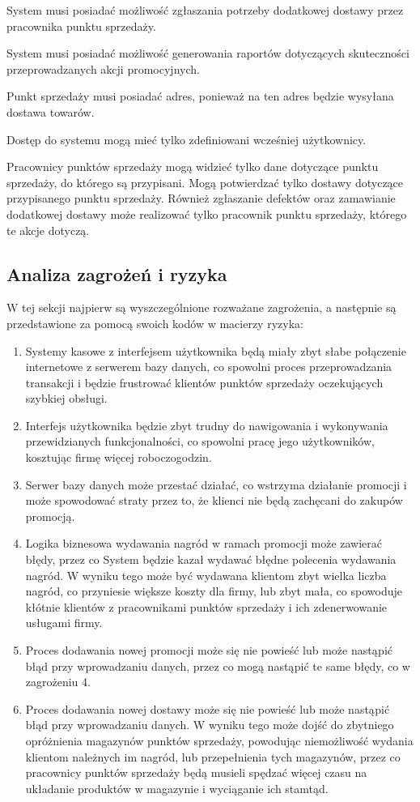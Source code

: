 \documentclass[a4paper,12pt]{article}
\begin{document}
System musi posiadać możliwość zgłaszania potrzeby dodatkowej dostawy przez pracownika punktu sprzedaży.

System musi posiadać możliwość generowania raportów dotyczących skuteczności przeprowadzanych akcji promocyjnych.

Punkt sprzedaży musi posiadać adres, ponieważ na ten adres będzie wysyłana dostawa towarów.

Dostęp do systemu mogą mieć tylko zdefiniowani wcześniej użytkownicy.

Pracownicy punktów sprzedaży mogą widzieć tylko dane dotyczące punktu sprzedaży, do którego są przypisani.
Mogą potwierdzać tylko dostawy dotyczące przypisanego punktu sprzedaży.
Również zgłaszanie defektów oraz zamawianie dodatkowej dostawy może realizować tylko pracownik punktu sprzedaży, którego te akcje dotyczą.

\subsection{Analiza zagrożeń i ryzyka}

W tej sekcji najpierw są wyszczególnione rozważane zagrożenia, a następnie są przedstawione za pomocą swoich kodów w macierzy ryzyka:
\begin{enumerate}
    \item Systemy kasowe z interfejsem użytkownika będą miały zbyt słabe połączenie internetowe z serwerem bazy danych, co spowolni proces przeprowadzania transakcji i będzie frustrować klientów punktów sprzedaży oczekujących szybkiej obsługi.
    \item Interfejs użytkownika będzie zbyt trudny do nawigowania i wykonywania przewidzianych funkcjonalności, co spowolni pracę jego użytkowników, kosztując firmę więcej roboczogodzin.
    \item Serwer bazy danych może przestać działać, co wstrzyma działanie promocji i może spowodować straty przez to, że klienci nie będą zachęcani do zakupów promocją.
    \item Logika biznesowa wydawania nagród w ramach promocji może zawierać błędy, przez co System będzie kazał wydawać błędne polecenia wydawania nagród.
    W wyniku tego może być wydawana klientom zbyt wielka liczba nagród, co przyniesie większe koszty dla firmy, lub zbyt mała, co spowoduje kłótnie klientów z pracownikami punktów sprzedaży i ich zdenerwowanie usługami firmy.
    \item Proces dodawania nowej promocji może się nie powieść lub może nastąpić błąd przy wprowadzaniu danych, przez co mogą nastąpić te same błędy, co w zagrożeniu 4.
    \item Proces dodawania nowej dostawy może się nie powieść lub może nastąpić błąd przy wprowadzaniu danych.
    W wyniku tego może dojść do zbytniego opróżnienia magazynów punktów sprzedaży, powodując niemożliwość wydania klientom należnych im nagród, lub przepełnienia tych magazynów, przez co pracownicy punktów sprzedaży będą musieli spędzać więcej czasu na układanie produktów w magazynie i wyciąganie ich stamtąd.
\end{enumerate}
\end{document}
